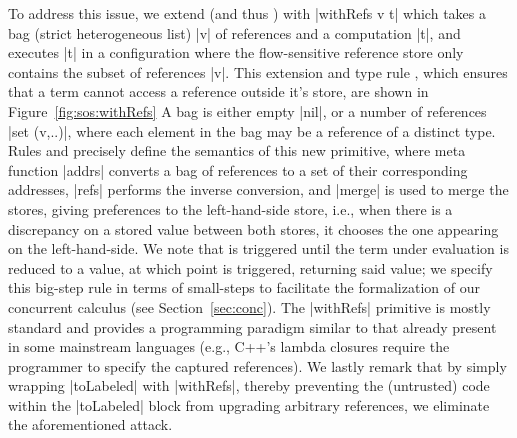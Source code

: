 To address this issue, we extend \liofs{} (and thus \lioafs{}) with |withRefs v
t| which takes a bag (strict heterogeneous list) |v| of references and a computation |t|, and executes |t|
in a configuration where the flow-sensitive reference store only contains the
subset of references |v|.
%
%
This extension and type rule , which ensures that a term
cannot access a reference outside it's store, are shown in
Figure~\ref{fig:sos:withRefs}
%
A bag is either empty |nil|, or a number of references |set (v,..)|, where each
element in the bag may be a reference of a distinct type.
%
Rules  and  precisely define the
semantics of this new primitive, where meta function |addrs| converts a bag of
references to a set of their corresponding addresses, |refs| performs the
inverse conversion, and |merge| is used to merge the stores, giving preferences
to the left-hand-side store, i.e., when there is a discrepancy on a stored
value between both stores, it chooses the one appearing on the left-hand-side.
%
We note that  is triggered until the term under
evaluation is reduced to a value, at which point  is
triggered, returning said value; we specify this big-step rule in terms of
small-steps to facilitate the formalization of our concurrent calculus (see
Section~\ref{sec:conc}).
%
The |withRefs| primitive is mostly standard and provides a programming paradigm
similar to that already present in some mainstream languages (e.g., C++'s
lambda closures require the programmer to specify the captured references).
%
We lastly remark that by simply wrapping |toLabeled| with |withRefs|,
thereby preventing the (untrusted) code within the |toLabeled| block from
upgrading arbitrary references, we eliminate the aforementioned attack.



